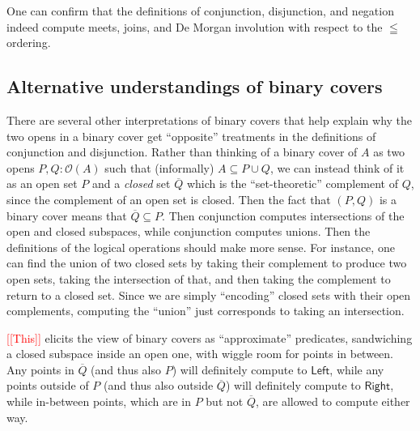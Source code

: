 \documentclass[conference]{IEEEtran}
\newcommand{\Open}[1]{\mathcal{O}({#1})}
\newcommand{\note}[1]{\textcolor{red}{[[{#1}]]}}
\begin{document}
One can confirm that the definitions of conjunction, disjunction, and negation indeed compute meets, joins, and De Morgan involution with respect to the $\leqq$ ordering.

\subsection{Alternative understandings of binary covers}

There are several other interpretations of binary covers that help explain why the two opens in a binary cover get ``opposite'' treatments in the definitions of conjunction and disjunction. Rather than thinking of a binary cover of $A$ as two opens $P, Q : \Open{A}$ such that (informally) $A \subseteq P \cup Q$, we can instead think of it as an open set $P$ and a \emph{closed} set $\overline{Q}$ which is the ``set-theoretic'' complement of $Q$, since the complement of an open set is closed. Then the fact that $(P, Q)$ is a binary cover means that $\overline{Q} \subseteq P$. Then conjunction computes intersections of the open and closed subspaces, while conjunction computes unions.
Then the definitions of the logical operations should make more sense. For instance, one can find the union of two closed sets by taking their complement to produce two open sets, taking the intersection of that, and then taking the complement to return to a closed set. Since we are simply ``encoding'' closed sets with their open complements, computing the ``union'' just corresponds to taking an intersection.

\note{This} elicits the view of binary covers as ``approximate'' predicates, sandwiching a closed subspace inside an open one, with wiggle room for points in between. Any points in $\overline{Q}$ (and thus also $P$) will definitely compute to $\mathsf{Left}$, while any points outside of $P$ (and thus also outside $\overline{Q}$) will definitely compute to $\mathsf{Right}$, while in-between points, which are in $P$ but not $\overline{Q}$, are allowed to compute either way.
\end{document}
